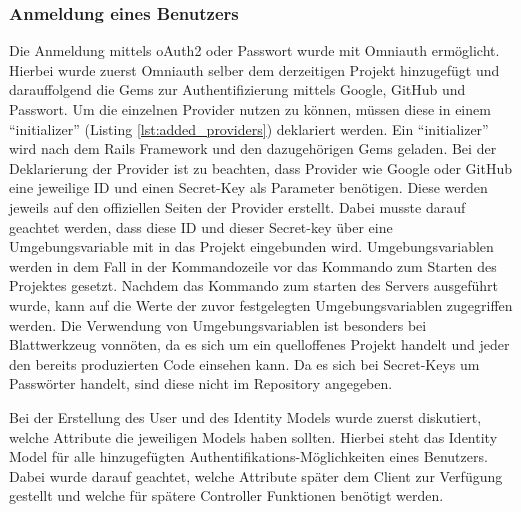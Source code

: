 \subsubsection{Anmeldung eines Benutzers}
\label{sec: sign-in-imp}
Die Anmeldung mittels oAuth2 oder Passwort wurde mit Omniauth ermöglicht. Hierbei wurde zuerst Omniauth selber dem derzeitigen Projekt hinzugefügt und darauffolgend die Gems zur Authentifizierung mittels Google, GitHub und Passwort. Um die einzelnen Provider nutzen zu können, müssen diese in einem \enquote{initializer} (Listing \ref{lst:added_providers}) deklariert werden. Ein \enquote{initializer} wird nach dem Rails Framework und den dazugehörigen Gems geladen. Bei der Deklarierung der Provider ist zu beachten, dass Provider wie Google oder GitHub eine jeweilige ID und einen Secret-Key als Parameter benötigen. Diese werden jeweils auf den offiziellen Seiten der Provider erstellt. Dabei musste darauf geachtet werden, dass diese ID und dieser Secret-key über eine Umgebungsvariable mit in das Projekt eingebunden wird. Umgebungsvariablen werden in dem Fall in der Kommandozeile vor das Kommando zum Starten des Projektes gesetzt. Nachdem das Kommando zum starten des Servers ausgeführt wurde, kann auf die Werte der zuvor festgelegten Umgebungsvariablen zugegriffen werden. Die Verwendung von Umgebungsvariablen ist besonders bei Blattwerkzeug vonnöten, da es sich um ein quelloffenes Projekt handelt und jeder den bereits produzierten Code einsehen kann. Da es sich bei Secret-Keys um Passwörter handelt, sind diese nicht im Repository angegeben.  

\begin{minipage}{\textwidth}
	
\end{minipage}

Bei der Erstellung des User und des Identity Models wurde zuerst diskutiert, welche Attribute die jeweiligen Models haben sollten. Hierbei steht das Identity Model für alle hinzugefügten Authentifikations-Möglichkeiten eines Benutzers. Dabei wurde darauf geachtet, welche Attribute später dem Client zur Verfügung gestellt und welche für spätere Controller Funktionen benötigt werden.

